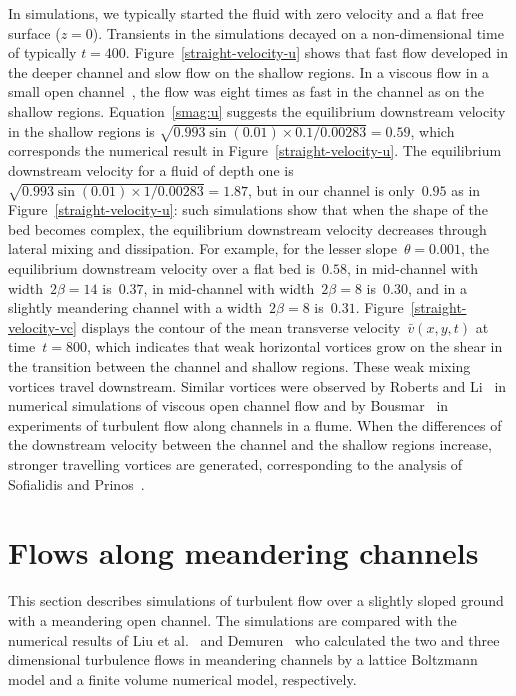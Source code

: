 \documentclass[twocolumn]{afmc_art}
\newcommand{\vv}{{\bar v}}
\begin{document}
In simulations, we typically started the fluid with zero velocity and a flat free surface ($z=0$). 
Transients in the simulations decayed on a non-dimensional time of typically $t=400$.
Figure~\ref{straight-velocity-u} shows that fast flow developed in the deeper channel and slow flow on the shallow regions.
In a viscous flow in a small open channel~\cite{Robertsli2006}, the flow was eight times as fast in the channel as on the shallow regions. 
Equation~\eqref{smag:u} suggests the equilibrium downstream velocity in the shallow regions is $\sqrt{0.993\sin(0.01)\times0.1/0.00283}=0.59$, which corresponds the numerical result in Figure~\ref{straight-velocity-u}. 
The equilibrium downstream velocity for a fluid of depth one is $\sqrt{0.993\sin(0.01)\times1/0.00283}=1.87$, but in our channel is only~$0.95$ as in Figure~\ref{straight-velocity-u}: 
such simulations show that when the shape of the bed becomes complex, the equilibrium downstream velocity decreases through lateral mixing and dissipation. 
For example, for the lesser slope~$\theta=0.001$, the equilibrium downstream velocity over a flat bed is~$0.58$, in mid-channel with  width~$2\beta=14$ is~$0.37$, in mid-channel with  width~$2\beta=8$ is~$0.30$, and in a slightly meandering channel with a width~$2\beta=8$ is~$0.31$.
Figure~\ref{straight-velocity-vc} displays the contour of the mean transverse velocity~$\vv(x,y,t)$ at time~$t=800$, which indicates that weak horizontal vortices grow on the shear in the transition between the channel and shallow regions.  
These weak mixing vortices travel downstream. 
Similar vortices were observed by Roberts and Li~\cite{Robertsli2006} in numerical simulations of viscous open channel flow and by Bousmar~\cite{Bousmar2003a} in experiments of turbulent flow along channels in a flume. 
When the differences of the downstream velocity between the channel and the shallow regions increase, stronger travelling vortices are generated, corresponding to the analysis of Sofialidis and Prinos~\cite{Sofialidis:1999fk}.





\section{Flows along meandering channels}

This section describes simulations of turbulent flow over a slightly sloped ground with a meandering open channel. 
The simulations are compared with the numerical results of Liu et al.~\cite{Liu2009} and Demuren~\cite{Demuren1993} who calculated the two and three dimensional turbulence flows in meandering channels by a lattice Boltzmann model and a finite volume numerical model, respectively.
\end{document}
